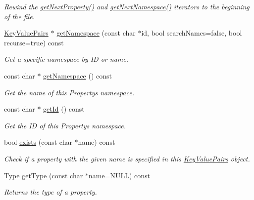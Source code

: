 \begin{DoxyCompactItemize}
\begin{DoxyCompactList}\small\item\em Rewind the \hyperlink{class_i_dream_sky_1_1_key_value_pairs_a27b208b167c0c7c45f22b8f38b34a116}{get\+Next\+Property()} and \hyperlink{class_i_dream_sky_1_1_key_value_pairs_abfb1c165f165bf9ff0fee62d252b38f1}{get\+Next\+Namespace()} iterators to the beginning of the file. \end{DoxyCompactList}\item 
\hyperlink{class_i_dream_sky_1_1_key_value_pairs}{Key\+Value\+Pairs} $\ast$ \hyperlink{class_i_dream_sky_1_1_key_value_pairs_a8999585186aefb8bd86516c94ceb6bf7}{get\+Namespace} (const char $\ast$id, bool search\+Names=false, bool recurse=true) const 
\begin{DoxyCompactList}\small\item\em Get a specific namespace by ID or name. \end{DoxyCompactList}\item 
const char $\ast$ \hyperlink{class_i_dream_sky_1_1_key_value_pairs_a52cdab2e216fc3b1450c629c325193df}{get\+Namespace} () const 
\begin{DoxyCompactList}\small\item\em Get the name of this Property\textquotesingle{}s namespace. \end{DoxyCompactList}\item 
const char $\ast$ \hyperlink{class_i_dream_sky_1_1_key_value_pairs_a9d64d0e8159d647d2590db2e313cbac9}{get\+Id} () const 
\begin{DoxyCompactList}\small\item\em Get the ID of this Property\textquotesingle{}s namespace. \end{DoxyCompactList}\item 
bool \hyperlink{class_i_dream_sky_1_1_key_value_pairs_ae1d8a4e41ad5c5e9290caf3fb684e1ac}{exists} (const char $\ast$name) const 
\begin{DoxyCompactList}\small\item\em Check if a property with the given name is specified in this \hyperlink{class_i_dream_sky_1_1_key_value_pairs}{Key\+Value\+Pairs} object. \end{DoxyCompactList}\item 
\hyperlink{class_i_dream_sky_1_1_key_value_pairs_a58bfd40015fc806fd3835c50b75ed179}{Type} \hyperlink{class_i_dream_sky_1_1_key_value_pairs_ac7b2f095c6c60629b4fd288e4d91fbbe}{get\+Type} (const char $\ast$name=N\+U\+LL) const 
\begin{DoxyCompactList}\small\item\em Returns the type of a property. \end{DoxyCompactList}\item 

\end{DoxyCompactItemize}
